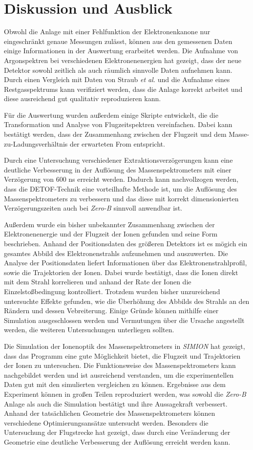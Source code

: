 \section{Diskussion und Ausblick}
Obwohl die Anlage mit einer Fehlfunktion der Elektronenkanone nur eingeschränkt genaue Messungen zulässt, können aus den gemessenen Daten einige Informationen in der Auswertung erarbeitet werden. Die Aufnahme von Argonspektren bei verschiedenen Elektronenenergien hat gezeigt, dass der neue Detektor sowohl zeitlich als auch räumlich sinnvolle Daten aufnehmen kann. Durch einen Vergleich mit Daten von Straub \textit{et al.} \cite{Straub} und die Aufnahme eines Restgasspektrums kann verifiziert werden, dass die Anlage korrekt arbeitet und diese ausreichend gut qualitativ reproduzieren kann. 

Für die Auswertung wurden außerdem einige Skripte entwickelt, die die Transformation und Analyse von Flugzeitspektren vereinfachen. Dabei kann bestätigt werden, dass der Zusammenhang zwischen der Flugzeit und dem Masse-zu-Ladungsverhältnis der erwarteten From entspricht.

Durch eine Untersuchung verschiedener Extraktionsverzögerungen kann eine deutliche Verbesserung in der Auflösung des Massenspektrometers mit einer Verzögerung von 600 ns erreicht werden. Dadurch kann nachvollzogen werden, dass die DETOF-Technik eine vorteilhafte Methode ist, um die Auflösung des Massenspektrometers zu verbessern und das diese mit korrekt dimensionierten Verzögerungszeiten auch bei \textit{Zero-B} sinnvoll anwendbar ist.

Außerdem wurde ein bisher unbekannter Zusammenhang zwischen der Elektronenenergie und der Flugzeit der Ionen gefunden und seine Form beschrieben. Anhand der Positionsdaten des größeren Detektors ist es mögich ein gesamtes Abbild des Elektronenstrahls aufzunehmen und auszuwerten. Die Analyse der Positionsdaten liefert Informationen über das Elektronenstrahlprofil, sowie die Trajektorien der Ionen. Dabei wurde bestätigt, dass die Ionen direkt mit dem Strahl korrelieren und anhand der Rate der Ionen die Einzelstoßbedingung kontrolliert. Trotzdem wurden bisher unzureichend untersuchte Effekte gefunden, wie die Überhöhung des Abbilds des Strahls an den Rändern und dessen Vebreiterung. Einige Gründe können mithilfe einer Simulation ausgeschlossen werden und Vermutungen über die Ursache angestellt werden, die weiteren Untersuchungen unterliegen sollten.

Die Simulation der Ionenoptik des Massenspektrometers in \textit{SIMION} hat gezeigt, dass das Programm eine gute Möglichkeit bietet, die Flugzeit und Trajektorien der Ionen zu untersuchen. Die Funktionsweise des Massenspektrometers kann nachgebildet werden und ist ausreichend verstanden, um die experimentellen Daten gut mit den simulierten vergleichen zu können. Ergebnisse aus dem Experiment können in großen Teilen reproduziert werden, was sowohl die \textit{Zero-B} Anlage als auch die Simulation bestätigt und ihre Aussagekraft verbessert. Anhand der tatsächlichen Geometrie des Massenspektrometers können verschiedene Optimierungsansätze untersucht werden. Besonders die Untersuchung der Flugstrecke hat gezeigt, dass durch eine Veränderung der Geometrie eine deutliche Verbesserung der Auflösung erreicht werden kann. 


